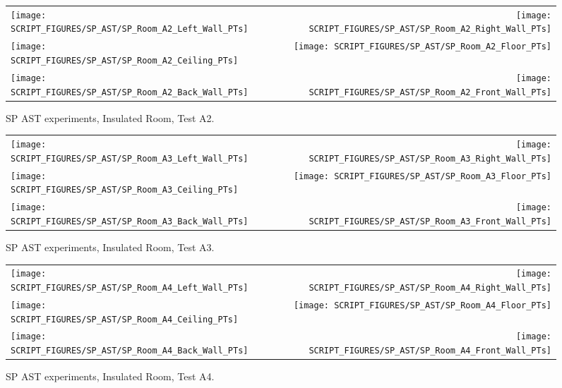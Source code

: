 \begin{figure}[p]
\begin{tabular*}{\textwidth}{l@{\extracolsep{\fill}}r}
\texttt{[image: SCRIPT\_FIGURES/SP\_AST/SP\_Room\_A2\_Left\_Wall\_PTs]} &  \texttt{[image: SCRIPT\_FIGURES/SP\_AST/SP\_Room\_A2\_Right\_Wall\_PTs]}  \\
\texttt{[image: SCRIPT\_FIGURES/SP\_AST/SP\_Room\_A2\_Ceiling\_PTs]}   &  \texttt{[image: SCRIPT\_FIGURES/SP\_AST/SP\_Room\_A2\_Floor\_PTs]}  \\
\texttt{[image: SCRIPT\_FIGURES/SP\_AST/SP\_Room\_A2\_Back\_Wall\_PTs]} &  \texttt{[image: SCRIPT\_FIGURES/SP\_AST/SP\_Room\_A2\_Front\_Wall\_PTs]}
\end{tabular*}
\caption[SP AST experiments, Insulated Room, Test A2]{SP AST experiments, Insulated Room, Test A2.}
\label{SP_Room_A2_PTs}
\end{figure}

\begin{figure}[p]
\begin{tabular*}{\textwidth}{l@{\extracolsep{\fill}}r}
\texttt{[image: SCRIPT\_FIGURES/SP\_AST/SP\_Room\_A3\_Left\_Wall\_PTs]} &  \texttt{[image: SCRIPT\_FIGURES/SP\_AST/SP\_Room\_A3\_Right\_Wall\_PTs]}  \\
\texttt{[image: SCRIPT\_FIGURES/SP\_AST/SP\_Room\_A3\_Ceiling\_PTs]}   &  \texttt{[image: SCRIPT\_FIGURES/SP\_AST/SP\_Room\_A3\_Floor\_PTs]}  \\
\texttt{[image: SCRIPT\_FIGURES/SP\_AST/SP\_Room\_A3\_Back\_Wall\_PTs]} &  \texttt{[image: SCRIPT\_FIGURES/SP\_AST/SP\_Room\_A3\_Front\_Wall\_PTs]}
\end{tabular*}
\caption[SP AST experiments, Insulated Room, Test A3]{SP AST experiments, Insulated Room, Test A3.}
\label{SP_Room_A3_PTs}
\end{figure}

\begin{figure}[p]
\begin{tabular*}{\textwidth}{l@{\extracolsep{\fill}}r}
\texttt{[image: SCRIPT\_FIGURES/SP\_AST/SP\_Room\_A4\_Left\_Wall\_PTs]} &  \texttt{[image: SCRIPT\_FIGURES/SP\_AST/SP\_Room\_A4\_Right\_Wall\_PTs]}  \\
\texttt{[image: SCRIPT\_FIGURES/SP\_AST/SP\_Room\_A4\_Ceiling\_PTs]}   &  \texttt{[image: SCRIPT\_FIGURES/SP\_AST/SP\_Room\_A4\_Floor\_PTs]}  \\
\texttt{[image: SCRIPT\_FIGURES/SP\_AST/SP\_Room\_A4\_Back\_Wall\_PTs]} &  \texttt{[image: SCRIPT\_FIGURES/SP\_AST/SP\_Room\_A4\_Front\_Wall\_PTs]}
\end{tabular*}
\caption[SP AST experiments, Insulated Room, Test A4]{SP AST experiments, Insulated Room, Test A4.}
\label{SP_Room_A4_PTs}
\end{figure}

